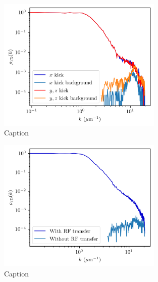\begin{figure}
    \centering
    \includegraphics[width=0.7\textwidth]{Fig/Chapter5/1D_background_low.png}
    \caption{Caption}
    \label{fig:my_label}
\end{figure}

\begin{figure}
    \centering
    \includegraphics[width=0.7\textwidth]{Fig/Chapter5/1D_background_high.png}
    \caption{Caption}
    \label{fig:my_label}
\end{figure}